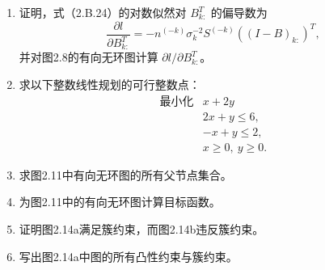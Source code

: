 \begin{enumerate}[label=\textbf{习题 \arabic*.},leftmargin=4.6em,labelsep=.7em]
\[
\bigl(R^{(T^{(i)})}(I-B)\bigr)_{(k)}=
\begin{cases}
(I-B)_{k:}&k\notin T^{(i)},\\
0&k\in T^{(i)},
\end{cases}
\qquad k=1,\ldots,p.
\]
\item 证明，式（2.B.24）的对数似然对 $B_{k:}^T$ 的偏导数为
\[
\frac{\partial l}{\partial B_{k:}^T}
 =-n^{(-k)}\sigma_k^{-2}S^{(-k)}((I-B)_{k:})^T,
\]
并对图2.8的有向无环图计算 $\partial l/\partial B_{k:}^T$。
\item 求以下整数线性规划的可行整数点：
\[
\begin{array}{rl}
\text{最小化}&x+2y\\
&2x+y\le6,\\
&-x+y\le2,\\
&x\ge0,\ y\ge0.
\end{array}
\]
\item 求图2.11中有向无环图的所有父节点集合。
\item 为图2.11中的有向无环图计算目标函数。
\item 证明图2.14a满足簇约束，而图2.14b违反簇约束。
\item 写出图2.14a中图的所有凸性约束与簇约束。
\end{enumerate}
\FloatBarrier
